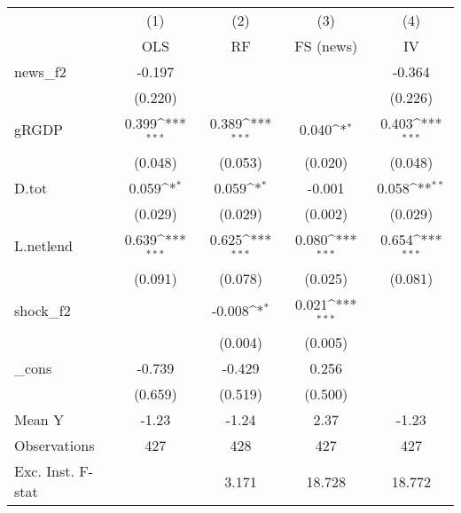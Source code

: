 {
\def\sym#1{\ifmmode^{#1}\else\(^{#1}\)\fi}
\begin{tabular}{l*{4}{c}}
\toprule
            &\multicolumn{1}{c}{(1)}&\multicolumn{1}{c}{(2)}&\multicolumn{1}{c}{(3)}&\multicolumn{1}{c}{(4)}\\
            &\multicolumn{1}{c}{OLS}&\multicolumn{1}{c}{RF}&\multicolumn{1}{c}{FS (news)}&\multicolumn{1}{c}{IV}\\
\midrule
news\_f2     &      -0.197         &                     &                     &      -0.364         \\
            &     (0.220)         &                     &                     &     (0.226)         \\
\addlinespace
gRGDP       &       0.399\sym{***}&       0.389\sym{***}&       0.040\sym{*}  &       0.403\sym{***}\\
            &     (0.048)         &     (0.053)         &     (0.020)         &     (0.048)         \\
\addlinespace
D.tot       &       0.059\sym{*}  &       0.059\sym{*}  &      -0.001         &       0.058\sym{**} \\
            &     (0.029)         &     (0.029)         &     (0.002)         &     (0.029)         \\
\addlinespace
L.netlend   &       0.639\sym{***}&       0.625\sym{***}&       0.080\sym{***}&       0.654\sym{***}\\
            &     (0.091)         &     (0.078)         &     (0.025)         &     (0.081)         \\
\addlinespace
shock\_f2    &                     &      -0.008\sym{*}  &       0.021\sym{***}&                     \\
            &                     &     (0.004)         &     (0.005)         &                     \\
\addlinespace
\_cons      &      -0.739         &      -0.429         &       0.256         &                     \\
            &     (0.659)         &     (0.519)         &     (0.500)         &                     \\
\midrule
Mean Y      &       -1.23         &       -1.24         &        2.37         &       -1.23         \\
Observations&         427         &         428         &         427         &         427         \\
Exc. Inst. F-stat&                     &       3.171         &      18.728         &      18.772         \\
\bottomrule
\end{tabular}
}
